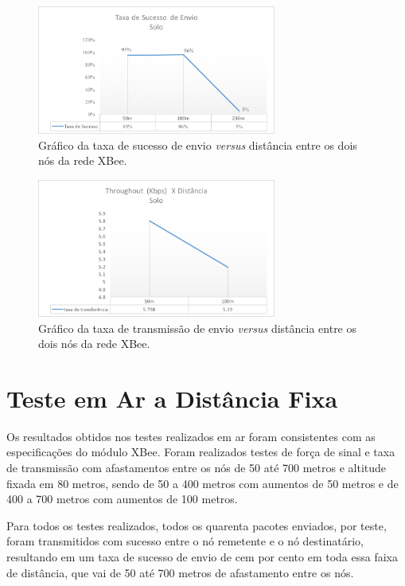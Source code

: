 \begin{figure} 
\center
\includegraphics[width=0.7\textwidth]{sucessRateChao.png}
\caption{Gráfico da taxa de sucesso de envio \emph{versus} distância entre os dois nós da rede XBee.} 
\label{fig:SuccessChao}
\end{figure} 

\begin{figure} 
\center
\includegraphics[width=0.7\textwidth]{throughputResultChao.png}
\caption{Gráfico da taxa de transmissão de envio \emph{versus} distância entre os dois nós da rede XBee.} 
\label{fig:ThroughputChao}
\end{figure}
 
\section{Teste em Ar a Distância Fixa}

Os resultados obtidos nos testes realizados em ar foram consistentes com as especificações do módulo XBee. Foram realizados testes de força de sinal e taxa de transmissão com afastamentos entre os nós de 50 até 700 metros e altitude fixada em 80 metros, sendo de 50 a 400 metros com aumentos de 50 metros e de 400 a 700 metros com aumentos de 100 metros.

Para todos os testes realizados, todos os quarenta pacotes enviados, por teste, foram transmitidos com sucesso entre o nó remetente e o nó destinatário, resultando em um taxa de sucesso de envio de cem por cento em toda essa faixa de distância, que vai de 50 até 700 metros de afastamento entre os nós.

